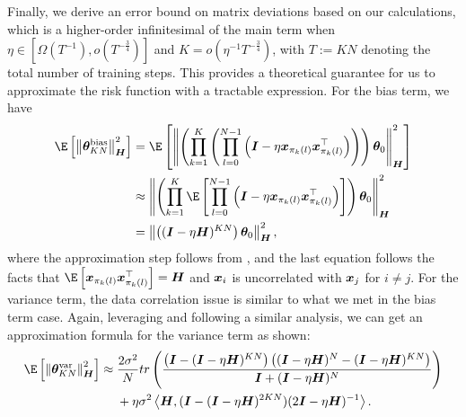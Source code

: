 Finally, we derive an error bound on matrix deviations based on our calculations, which is a higher-order infinitesimal of the main term when $\eta \in \left[\Omega\left(T^{-1}\right), o(T^{-\frac{3}{4}})\right]$ and $K = o\left(\eta^{-1} T^{-\frac{3}{4}}\right)$, with $T:=KN$ denoting the total number of training steps. This provides a theoretical guarantee for us to approximate the risk function with a tractable expression. For the bias term, we have
\begin{align*}
    \E\left[\left\|\vtheta_{KN}^{\bias}\right\|_{\mH}^2\right]
    &= \E\left[\left\|\left(\prod_{k=1}^{K} \left(\prod_{l=0}^{N-1} \left(\mI-\eta \vx_{\pi_k(l)}\vx_{\pi_k(l)}^{\top}\right)\right)\right)\vtheta_0\right\|_{\mH}^2\right] \\
    &\approx \left\|\left(\prod_{k=1}^{K} \E\left[\prod_{l=0}^{N-1} \left(\mI-\eta \vx_{\pi_k(l)}\vx_{\pi_k(l)}^{\top}\right)\right]\right)\vtheta_0\right\|_{\mH}^2 \\
    &=\left\|\left((\mI-\eta\mH)^{KN}\right)\vtheta_0\right\|_{\mH}^2,
\end{align*}
where the approximation step follows from , and the last equation follows the facts that $\E\left[\vx_{\pi_k(l)}\vx_{\pi_k(l)}^{\top}\right] = \mH$ and ${\bm{x}}_i$ is uncorrelated with ${\bm{x}}_j$ for $i \neq j$.
For the variance term, the data correlation issue is similar to what we met in the bias term case. Again, leveraging  and following a similar analysis, we can get an approximation formula for the variance term as shown:
\begin{align*}
        \E\left[\left\|\vtheta_{KN}^{\var}\right\|_{\mH}^2\right]&\approx\frac{2\sigma^2}{N} tr\left(\frac{\left(\mI -(\mI -\eta\mH)^{KN}\right)\left((\mI -\eta\mH)^{N} -(\mI -\eta\mH)^{KN}\right)}{\mI + (\mI -\eta\mH)^N}\right)\\
    &~~~~+{\eta\sigma^2}\inp{\mH}{(\mI - (\mI - \eta \mH)^{2KN})(2\mI-\eta\mH)^{-1}}.
\end{align*}

